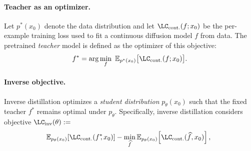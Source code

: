 \paragraph{Teacher as an optimizer.}
  Let $p^*(x_0)$ denote the data distribution and let $\LC_{\text{cont.}}(f; x_0)$ be the per-example training loss
  used to fit a continuous diffusion model $f$ from data.
  The pretrained \emph{teacher} model is defined as the optimizer of this objective:
  \begin{equation}
    f^* = \arg\min_f \ \mathbb{E}_{p^*(x_0)}\big[ \LC_{\text{cont.}}(f; x_0)\big]. \nonumber
    \label{eq:teacher_objective_cont}
  \end{equation}


\paragraph{Inverse objective.}
Inverse distillation optimizes a \emph{student distribution} $p_\theta(x_0)$ such that the fixed teacher $f^*$ remains optimal under $p_\theta$. Specifically, inverse distillation considers objective $\LC_{\text{inv}}(\theta) :=$
\begin{gather}
     \!\!\mathbb{E}_{p_{\theta}(x_0)} \!\left[\LC_{\text{cont.}}(f^*\!\!, x_0)\right]  - \min_{\widehat{f}} \mathbb{E}_{p_{\theta}(x_0)} \! \left[\LC_{\text{cont.}}(\widehat{f}, x_0)\right], 
     \label{eq:inverse optimization problem} 
\end{gather}

